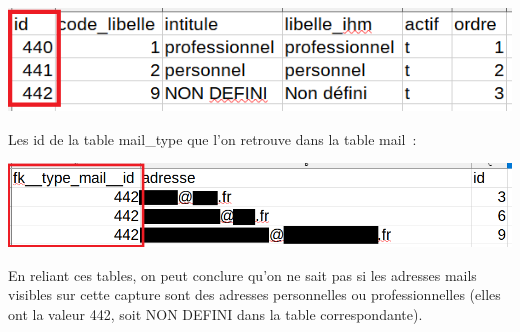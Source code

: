 \includegraphics{annexes/image11.png}

Les id de la table mail\_type que l'on retrouve dans la table mail~:

\includegraphics[width=\textwidth]{annexes/image12.png}

En reliant ces tables, on peut conclure qu'on ne sait pas si les
adresses mails visibles sur cette capture sont des adresses personnelles
ou professionnelles (elles ont la valeur 442, soit NON DEFINI dans la
table correspondante).
